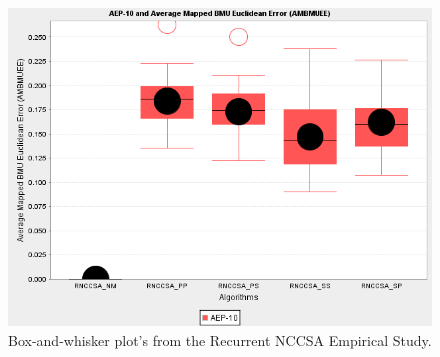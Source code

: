 \begin{figure}[htp]
{	\label{fig:cells:network:rnccsa:ambmue:boxplot} %
	\begin{minipage}[t]{\textwidth}
		\centering \includegraphics[scale=0.41]{Cells/RNCCSA-AMBMUE-plot}
	\end{minipage}}%
	\caption{Box-and-whisker plot's from the Recurrent NCCSA Empirical Study.}
	\label{fig:cells:nccsa::study1:all:boxplot} %
\end{figure}


